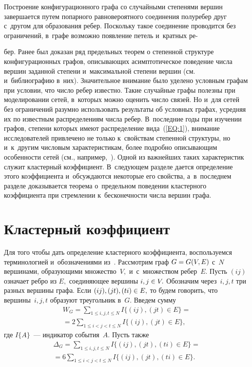 \begin{multicols}{2}
Построение конфигурационного
 графа со случайными степенями вершин завершается путем попарного
равновероятного соединения полуребер друг с~другом для образования ребер. 
Поскольку такое соединение проводится без ограничений, в~графе
возможно появление петель и~кратных ре-\linebreak\vspace*{-12pt}

\pagebreak

\noindent
бер. Ранее был доказан ряд 
предельных тео\-рем о степенной структуре конфигурационных графов, 
описывающих асимптотическое поведение числа вершин заданной степени и~максимальной 
степени вершин (см.~\cite{Pav1, Pav2} и~библиографию в~них). Значительное 
внимание было уделено условным графам при условии, что число ребер известно.
 Такие случайные графы полезны при моделировании сетей, в~которых можно 
 оценить число связей. Но и~для сетей без ограничений разумно использовать 
 результаты об условных графах, усредняя их по известным распределениям числа ребер. 
 В~последние годы при изучении графов, степени которых имеют распределение 
 вида~(\ref{EQ:1}), внимание исследователей привлечено не только к~свойствам 
 степенной структуры, но и~к~другим числовым характеристикам, более подробно 
 описывающим особенности сетей (см., например,~\cite{New}). Одной из важнейших 
 таких характеристик служит кластерный коэффициент. 
 В~следующем разделе дается определение этого коэффициента и~обсуждаются 
 некоторые его свойства, а~в~последнем разделе доказывается тео\-ре\-ма о~предельном 
 поведении кластерного коэффициента при стремлении к~бесконечности числа вершин графа.

\section{Кластерный коэффициент} %

Для того чтобы дать определение кластерного коэффициента, воспользуемся 
терминологией и~обозначениями из~\cite{Hof}.
Рассмотрим граф $G\hm=G(V,E)$ с~$N$ вершинами, образующими множество~$V,$ 
и~с~множеством ребер~$E.$ Пусть $(ij)$ означает ребро из $E,$ соединяющее
вершины $i,j\hm\in V.$ Обозначим через~$i,j,t$ три разных вершины графа. 
Если $(ij),(jt),(ti)\hm\in E,$ то будем говорить, что вершины~$i,j,t$
образуют треугольник в~$G.$ Введем сумму
\begin{multline*}
W_G=\sum\limits_{1\leqslant i,j,t\leqslant N} 
I\{(ij),(jt)\in E\}={}\\
{}=2\sum\limits_{1\leqslant i<j<t\leqslant N} 
I\{(ij),(jt) \in E\},
\end{multline*}
где $I\{A\}$~--- индикатор события~$A.$ Пусть также
\begin{multline*}
\Delta_G=\sum\limits_{1\leqslant i,j,t\leqslant N} 
I\{(ij),(jt),(ti)\in E\}={}\\
{}=6\sum\limits_{1\leqslant i<j<t\leqslant N} 
I\{(ij),(jt),(ti)\in E\}.
\end{multline*}


\end{multicols}
